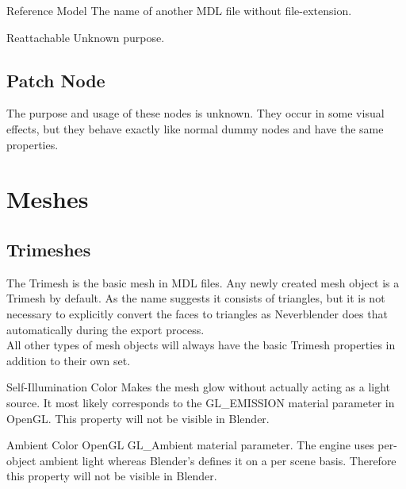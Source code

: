 \begin{propertyAurora}{Reference Model}
The name of another MDL file without file-extension.
\end{propertyAurora}

\begin{propertyAurora}{Reattachable}
Unknown purpose.
\end{propertyAurora}

\subsection{Patch Node}
The purpose and usage of these nodes is unknown. They occur in some visual effects, but
they behave exactly like normal dummy nodes and have the same properties.

\section{Meshes}

\subsection{Trimeshes}

\begin{minipage}[t]{0.55\textwidth}
    The Trimesh is the basic mesh in MDL files. Any newly created mesh object is a 
    Trimesh by default. As the name suggests it consists of triangles, but it is 
    not necessary to explicitly convert the faces to triangles as Neverblender does that 
    automatically during the export process. \\
    
    All other types of mesh objects will always have the basic Trimesh properties in addition to 
    their own set.
\end{minipage}\hfill
\begin{minipage}[t]{0.4\textwidth}
    \centering{}
    \label{fig1}
\end{minipage}

\begin{propertyAurora}{Self-Illumination Color}
Makes the mesh glow without actually acting as a light source. It most likely corresponds to the 
GL\_EMISSION material parameter in OpenGL. This property will not be visible in Blender.
\end{propertyAurora}

\begin{propertyAurora}{Ambient Color}
OpenGL GL\_Ambient material parameter. The engine uses per-object ambient light whereas Blender's 
defines it on a per scene basis. Therefore this property will not be visible in Blender.
\end{propertyAurora}


